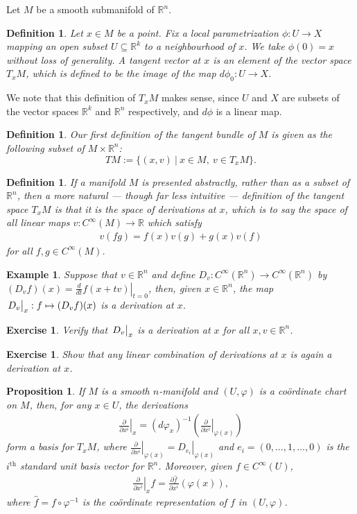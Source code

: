 \documentclass{amsart}          %
\newtheorem{proposition}[theorem]{Proposition}
\newtheorem{definition}[theorem]{Definition}
\newtheorem{example}[theorem]{Example}
\newtheorem{exercise}[theorem]{Exercise}
\newcommand{\R}{\mathbb R}
\newcommand{\pdiff}[2]{\frac{\partial #1}{\partial #2}}
\newcommand{\diff}[2]{\frac{d #1}{d #2}}
\begin{document}
Let $M$ be a smooth submanifold of $\R^n$. 
\begin{definition}
Let $x\in M$ be a point. Fix a local parametrization $\phi:U\to X$ mapping an open subset $U\subseteq\R^k$ to a neighbourhood of $x$. We take $\phi(0)=x$ without loss of generality. A \emph{tangent vector at $x$} is an element of the vector space $T_x M$, which is defined to be the image of the map $d\phi_0:U\to X$.
\end{definition}
We note that this definition of $T_xM$ makes sense, since $U$ and $X$ are subsets of the vector spaces $\R^k$ and $\R^n$ respectively, and $d\phi$ is a linear map.
\begin{definition}
Our first definition of \emph{the tangent bundle of $M$} is given as the following subset of $M\times\R^n$:
\[
TM:=
\{
(x,v)~|~x\in M,~v\in T_x M
\}.
\]
\end{definition}
\begin{definition}
	If a manifold $M$ is presented abstractly, rather than as a subset of $\R^n$, then a more natural --- though far less intuitive --- definition of the tangent space $T_xM$ is that it is the \textit{space of derivations at $x$}, which is to say the space of all linear maps $v:C^\infty(M)\to\R$ which satisfy\begin{align*}
	v(fg)=f(x)v(g)+g(x)v(f)
	\end{align*}for all $f,g\in C^\infty(M)$.
\end{definition}
\begin{example}
	Suppose that $v\in\R^n$ and define $D_v:C^\infty(\R^n)\to C^\infty(\R^n)$ by $(D_vf)(x)=\left.\diff{}{t}f(x+tv)\right|_{t=0}$, then, given $x\in\R^n$, the map $\left.D_v\vphantom{\diff{}{x}}\right|_x:f\mapsto (D_vf)(x)$ is a derivation at $x$.
\end{example}
\begin{exercise}
	Verify that $\left.D_v\vphantom{\diff{}{x}}\right|_x$ is a derivation at $x$ for all $x,v\in\R^n$.
\end{exercise}
\begin{exercise}
	Show that any linear combination of derivations at $x$ is again a derivation at $x$.
\end{exercise}
\begin{proposition}
	If $M$ is a smooth $n$-manifold and $(U,\varphi)$ is a co\"{o}rdinate chart on $M$, then, for any $x\in U$, the derivations\begin{align*}
	\left.\pdiff{}{x^i}\right|_x=\left(d\varphi_x\right)^{-1}\left(\left.\pdiff{}{x^i}\right|_{\varphi(x)}\right)
	\end{align*}form a basis for $T_xM$, where $\left.\pdiff{}{x^i}\right|_{\varphi(x)}=\left.D_{e_i}\right|_{\varphi(x)}$ and $e_i=(0,\dots,1,\dots,0)$ is the $i^\text{th}$ standard unit basis vector for $\R^n$. Moreover, given $f\in C^\infty(U)$,\begin{align*}
	\left.\pdiff{}{x^i}\right|_xf=\pdiff{\widehat{f}}{x^i}(\varphi(x)),
	\end{align*}where $\widehat{f}=f\circ\varphi^{-1}$ is the co\"{o}rdinate representation of $f$ in $(U,\varphi)$.
\end{proposition}
\end{document}
